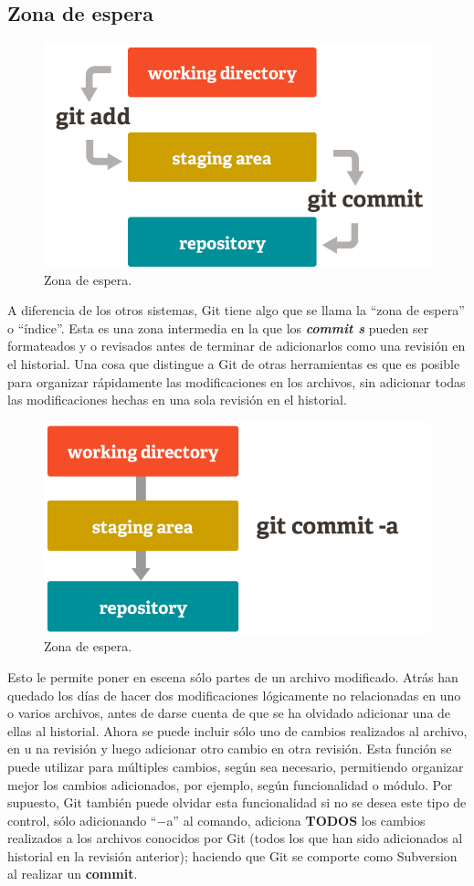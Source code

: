 \documentclass[12pt, spanish, oneside, onecolumn, a4paper]{report}
\begin{document}
\subsection{Zona de espera} 
\label{sec:stagingarea} 
\begin{figure} 
  \begin{center} 
    \includegraphics[width=.6\textwidth,keepaspectratio=true]{index1.png} 
  \end{center} 
  \caption{Zona de espera.} 
\end{figure} A diferencia de los otros sistemas, Git tiene algo que se llama la ``zona de espera'' o ``índice''. Esta es una zona intermedia en la que los 
\textbf{\emph{commit s}} pueden ser formateados y o revisados antes de terminar de adicionarlos como una revisión en el historial. Una cosa que distingue a Git de otras herramientas es que es posible para organizar rápidamente las modificaciones en los archivos, sin adicionar todas las modificaciones hechas en una sola revisión en el historial. 
\begin{figure} 
  \begin{center} 
    \includegraphics[width=.6\textwidth,keepaspectratio=true]{index2.png} 
  \end{center} 
  \caption{Zona de espera.} 
\end{figure} Esto le permite poner en escena sólo partes de un archivo modificado. Atrás han quedado los días de hacer dos modificaciones lógicamente no relacionadas en uno o varios archivos, antes de darse cuenta de que se ha olvidado adicionar una de ellas al historial. Ahora se puede incluir sólo uno de cambios realizados al archivo, en u na revisión y luego adicionar otro cambio en otra revisión. Esta función se puede utilizar para múltiples cambios, según sea necesario, permitiendo organizar mejor los cambios adicionados, por ejemplo, según funcionalidad o módulo. Por supuesto, Git también puede olvidar esta funcionalidad si no se desea este tipo de control, sólo adicionando ``$-$a'' al comando, adiciona 
\textbf{TODOS} los cambios realizados a los archivos conocidos por Git (todos los que han sido adicionados al historial en la revisión anterior); haciendo que Git se comporte como Subversion al realizar un 
\textbf{commit}. 
\end{document}
